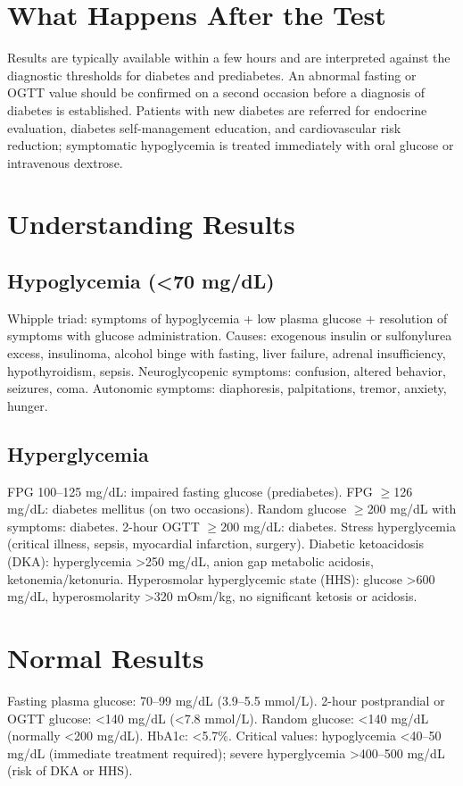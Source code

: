 \section*{What Happens After the Test}
Results are typically available within a few hours and are interpreted against the diagnostic thresholds for diabetes and prediabetes. An abnormal fasting or OGTT value should be confirmed on a second occasion before a diagnosis of diabetes is established. Patients with new diabetes are referred for endocrine evaluation, diabetes self-management education, and cardiovascular risk reduction; symptomatic hypoglycemia is treated immediately with oral glucose or intravenous dextrose.
\section*{Understanding Results}
\subsection*{Hypoglycemia (<70 mg/dL)}
Whipple triad: symptoms of hypoglycemia + low plasma glucose + resolution of symptoms with glucose administration. Causes: exogenous insulin or sulfonylurea excess, insulinoma, alcohol binge with fasting, liver failure, adrenal insufficiency, hypothyroidism, sepsis. Neuroglycopenic symptoms: confusion, altered behavior, seizures, coma. Autonomic symptoms: diaphoresis, palpitations, tremor, anxiety, hunger.
\subsection*{Hyperglycemia}
FPG 100--125 mg/dL: impaired fasting glucose (prediabetes). FPG $\geq$126 mg/dL: diabetes mellitus (on two occasions). Random glucose $\geq$200 mg/dL with symptoms: diabetes. 2-hour OGTT $\geq$200 mg/dL: diabetes. Stress hyperglycemia (critical illness, sepsis, myocardial infarction, surgery). Diabetic ketoacidosis (DKA): hyperglycemia >250 mg/dL, anion gap metabolic acidosis, ketonemia/ketonuria. Hyperosmolar hyperglycemic state (HHS): glucose >600 mg/dL, hyperosmolarity >320 mOsm/kg, no significant ketosis or acidosis.
\section*{Normal Results}
Fasting plasma glucose: 70--99 mg/dL (3.9--5.5 mmol/L). 2-hour postprandial or OGTT glucose: <140 mg/dL (<7.8 mmol/L). Random glucose: <140 mg/dL (normally <200 mg/dL). HbA1c: <5.7\%. Critical values: hypoglycemia <40--50 mg/dL (immediate treatment required); severe hyperglycemia >400--500 mg/dL (risk of DKA or HHS).
